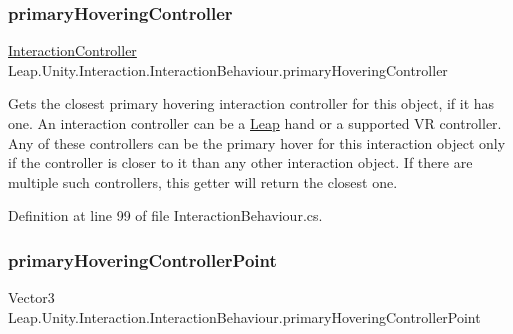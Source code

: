 \mbox{\label{class_leap_1_1_unity_1_1_interaction_1_1_interaction_behaviour_a234b0a5dc3391758b1e423ae5006c572}} 
\subsubsection{\texorpdfstring{primaryHoveringController}{primaryHoveringController}}
{\footnotesize\ttfamily \mbox{\hyperlink{class_leap_1_1_unity_1_1_interaction_1_1_interaction_controller}{Interaction\+Controller}} Leap.\+Unity.\+Interaction.\+Interaction\+Behaviour.\+primary\+Hovering\+Controller\hspace{0.3cm}{\ttfamily [get]}}



Gets the closest primary hovering interaction controller for this object, if it has one. An interaction controller can be a \mbox{\hyperlink{namespace_leap_1_1_unity_1_1_leap}{Leap}} hand or a supported VR controller. Any of these controllers can be the primary hover for this interaction object only if the controller is closer to it than any other interaction object. If there are multiple such controllers, this getter will return the closest one. 



Definition at line 99 of file Interaction\+Behaviour.\+cs.

\mbox{\label{class_leap_1_1_unity_1_1_interaction_1_1_interaction_behaviour_aebc14659cfc1f85f97c2fa0a8e659787}} 
\subsubsection{\texorpdfstring{primaryHoveringControllerPoint}{primaryHoveringControllerPoint}}
{\footnotesize\ttfamily Vector3 Leap.\+Unity.\+Interaction.\+Interaction\+Behaviour.\+primary\+Hovering\+Controller\+Point\hspace{0.3cm}{\ttfamily [get]}}




